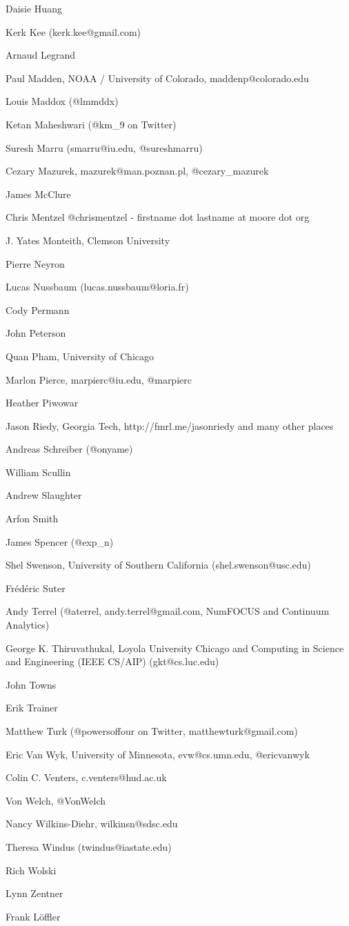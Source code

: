 \documentclass[11pt, oneside]{amsart}
\begin{document}
Daisie Huang

Kerk Kee (kerk.kee@gmail.com)

Arnaud Legrand

Paul Madden, NOAA / University of Colorado, maddenp@colorado.edu

Louis Maddox (@lmmddx)

Ketan Maheshwari (@km\_9 on Twitter)

Suresh Marru (smarru@iu.edu, @sureshmarru) 

Cezary Mazurek, mazurek@man.poznan.pl, @cezary\_mazurek

James McClure

Chris Mentzel @chrismentzel - firstname dot lastname at moore dot org

J. Yates Monteith, Clemson University

Pierre Neyron

Lucas Nussbaum (lucas.nussbaum@loria.fr)

Cody Permann

John Peterson

Quan Pham, University of Chicago

Marlon Pierce, marpierc@iu.edu, @marpierc

Heather Piwowar

Jason Riedy, Georgia Tech, http://fmrl.me/jasonriedy and many other places

Andreas Schreiber (@onyame)

William Scullin

Andrew Slaughter

Arfon Smith

James Spencer (@exp\_n)

Shel Swenson, University of Southern California (shel.swenson@usc.edu)

Fr\'{e}d\'{e}ric Suter

Andy Terrel (@aterrel, andy.terrel@gmail.com, NumFOCUS and Continuum Analytics)

George K. Thiruvathukal, Loyola University Chicago and Computing in Science and Engineering (IEEE CS/AIP) (gkt@cs.luc.edu)

John Towns

Erik Trainer

Matthew Turk (@powersoffour on Twitter, matthewturk@gmail.com)

Eric Van Wyk, University of Minnesota, evw@cs.umn.edu, @ericvanwyk

Colin C. Venters, c.venters@hud.ac.uk

Von Welch, @VonWelch

Nancy Wilkins-Diehr, wilkinsn@sdsc.edu

Theresa Windus (twindus@iastate.edu)

Rich Wolski

Lynn Zentner

Frank Löffler






\end{document}
